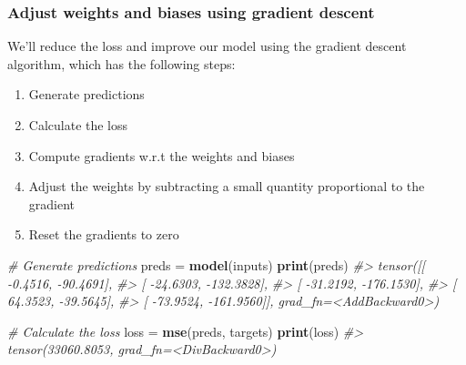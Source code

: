 \documentclass[]{book}
\newenvironment{Shaded}{\begin{snugshade}}{\end{snugshade}}
\newcommand{\CommentTok}[1]{\textcolor[rgb]{0.56,0.35,0.01}{\textit{#1}}}
\newcommand{\KeywordTok}[1]{\textcolor[rgb]{0.13,0.29,0.53}{\textbf{#1}}}
\newcommand{\NormalTok}[1]{#1}
\newcommand{\OperatorTok}[1]{\textcolor[rgb]{0.81,0.36,0.00}{\textbf{#1}}}
\newcommand{\StringTok}[1]{\textcolor[rgb]{0.31,0.60,0.02}{#1}}
\providecommand{\tightlist}{%
  \setlength{\itemsep}{0pt}\setlength{\parskip}{0pt}}
\begin{document}
\hypertarget{adjust-weights-and-biases-using-gradient-descent}{%
\subsubsection{Adjust weights and biases using gradient descent}\label{adjust-weights-and-biases-using-gradient-descent}}

We'll reduce the loss and improve our model using the gradient descent algorithm, which has the following steps:

\begin{enumerate}
\def\labelenumi{\arabic{enumi}.}
\tightlist
\item
  Generate predictions
\item
  Calculate the loss
\item
  Compute gradients w.r.t the weights and biases
\item
  Adjust the weights by subtracting a small quantity proportional to the gradient
\item
  Reset the gradients to zero
\end{enumerate}

\begin{Shaded}
\begin{Highlighting}[]
\CommentTok{# Generate predictions}
\NormalTok{preds =}\StringTok{ }\KeywordTok{model}\NormalTok{(inputs)}
\KeywordTok{print}\NormalTok{(preds)}
\CommentTok{#> tensor([[  -0.4516,  -90.4691],}
\CommentTok{#>         [ -24.6303, -132.3828],}
\CommentTok{#>         [ -31.2192, -176.1530],}
\CommentTok{#>         [  64.3523,  -39.5645],}
\CommentTok{#>         [ -73.9524, -161.9560]], grad_fn=<AddBackward0>)}
\end{Highlighting}
\end{Shaded}

\begin{Shaded}
\begin{Highlighting}[]
\CommentTok{# Calculate the loss}
\NormalTok{loss =}\StringTok{ }\KeywordTok{mse}\NormalTok{(preds, targets)}
\KeywordTok{print}\NormalTok{(loss)}
\CommentTok{#> tensor(33060.8053, grad_fn=<DivBackward0>)}
\end{Highlighting}
\end{Shaded}

\begin{Shaded}
\end{Shaded}
\end{document}
